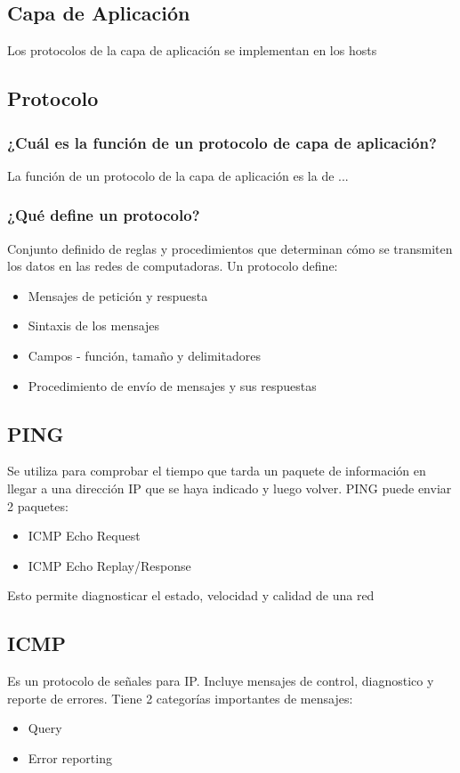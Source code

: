 
\subsection{Capa de Aplicación}\label{sec:capaaplicacion}

Los protocolos de la capa de aplicación se implementan en los hosts


\subsection{Protocolo\label{sec:protocolo}}


\subsubsection{ ¿Cuál es la función de un protocolo de capa de aplicación?}

La función de un protocolo de la capa de aplicación es la de ...

\subsubsection{¿Qué define un protocolo?} 
Conjunto definido de reglas y procedimientos que determinan cómo se transmiten los datos en las redes de computadoras. Un protocolo define:

\begin{itemize}
    \item Mensajes de petición y respuesta
    \item Sintaxis de los mensajes
    \item Campos - función, tamaño y delimitadores
    \item Procedimiento de envío de mensajes y sus respuestas
\end{itemize}

\subsection{PING}

Se utiliza para comprobar el tiempo que tarda un paquete de información en llegar a una dirección IP que se haya indicado y luego volver. PING puede enviar 2 paquetes:

\begin{itemize}
    \item ICMP Echo Request
    \item ICMP Echo Replay/Response
\end{itemize}

Esto permite diagnosticar el estado, velocidad y calidad de una red

\subsection{ICMP}

Es un protocolo de señales para IP. Incluye mensajes de control, diagnostico y reporte de errores. Tiene 2 categorías importantes de mensajes:
\begin{itemize}
    \item Query
    \item Error reporting
\end{itemize}